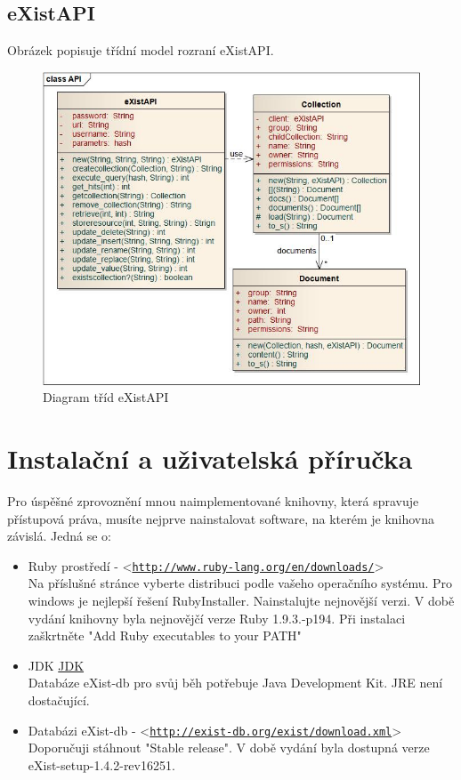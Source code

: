 \documentclass[11pt,twoside,a4paper]{book}
\let\oldUrl\url
\renewcommand\url[1]{<\texttt{\oldUrl{#1}}>}
\begin{document}
\section{eXistAPI}
Obrázek popisuje třídní model rozraní eXistAPI.
\begin{figure}
\includegraphics[width=15cm]{eXistAPI.jpg}
\caption{Diagram tříd eXistAPI}
\label{fig:eXistAPI}
\end{figure}


\chapter{Instalační a uživatelská příručka}

Pro úspěšné zprovoznění mnou naimplementované knihovny, která spravuje přístupová práva, musíte nejprve nainstalovat software, na kterém je knihovna závislá. Jedná se o:
\begin{itemize}
\item Ruby prostředí - \url{http://www.ruby-lang.org/en/downloads/}
\\ Na příslušné stránce vyberte distribuci podle vašeho operačního systému. Pro windows je nejlepší řešení RubyInstaller. Nainstalujte nejnovější verzi. V době vydání knihovny byla nejnovějčí verze Ruby 1.9.3.-p194.  Při instalaci zaškrtněte "Add Ruby executables to your PATH"
\item JDK \href{http://www.oracle.com/technetwork/java/javase/downloads/jdk-7u4-downloads-1591156.html}{JDK}
\\ Databáze eXist-db pro svůj běh potřebuje Java Development Kit. JRE není dostačující.
\item Databázi eXist-db - \url{http://exist-db.org/exist/download.xml}
\\ Doporučuji stáhnout "Stable release". V době vydání byla dostupná verze eXist-setup-1.4.2-rev16251.
\end{itemize}
\end{document}
